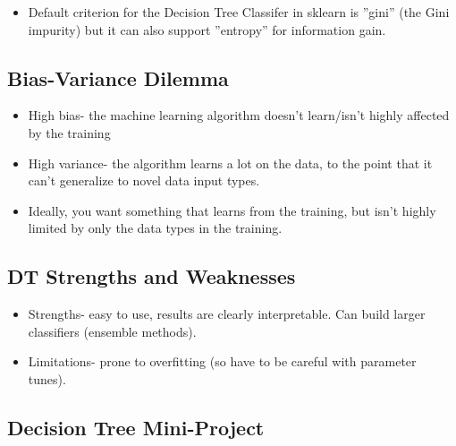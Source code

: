 \documentclass[12pt]{report}
\begin{document}
\begin{itemize}

\item Default criterion for the Decision Tree Classifer in sklearn is ''gini'' (the Gini impurity) but it can also support ''entropy'' for information gain. 

\end{itemize}

\subsection{Bias-Variance Dilemma}

\begin{itemize}

\item High bias- the machine learning algorithm doesn't learn/isn't highly affected by the training

\item High variance- the algorithm learns a lot on the data, to the point that it can't generalize to novel data input types. 

\item Ideally, you want something that learns from the training, but isn't highly limited by only the data types in the training. 

\end{itemize}

\subsection{DT Strengths and Weaknesses}

\begin{itemize}

\item Strengths- easy to use, results are clearly interpretable. Can build larger classifiers (ensemble methods). 

\item Limitations- prone to overfitting (so have to be careful with parameter tunes).   

\end{itemize}

\subsection{Decision Tree Mini-Project}
\end{document}
